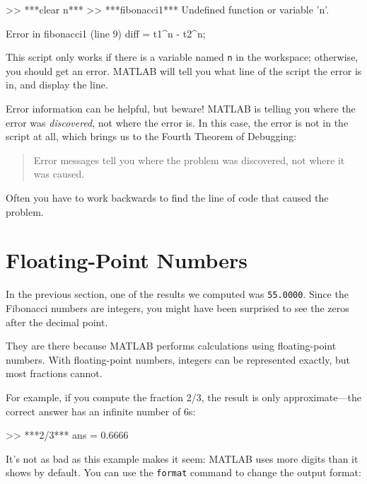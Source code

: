 \begin{code}
>> ***clear n***
>> ***fibonacci1***
Undefined function or variable 'n'.

Error in fibonacci1 (line 9)
diff = t1^n - t2^n;
\end{code}

This script only works if there is a variable named \lstinline{n} in the workspace; otherwise, you should get an error. 
MATLAB will tell you what line of the script the error is in, and display the line.



Error information can be helpful, but beware!  MATLAB is telling you
where the error was \emph{discovered}, not where the error is.  In this
case, the error is not in the script at all, which brings us to the Fourth Theorem of Debugging:

\begin{quote}
Error messages tell you where the problem was discovered,
not where it was caused.
\end{quote}

Often you have to work backwards to find the line of code that caused the problem.

\section{Floating-Point Numbers}

In the previous section, one of the results we computed was \lstinline{55.0000}.  Since the Fibonacci numbers are integers, you might have been surprised to see the zeros after the decimal point.

They are there because MATLAB performs calculations using floating-point numbers.  With floating-point numbers, integers can be represented exactly, but most fractions cannot.


For example, if you compute the fraction 2/3, the result is only approximate---the correct answer has an infinite number of 6s:

\begin{code}
>> ***2/3***
ans = 0.6666
\end{code}

 

It's not as bad as this example makes it seem: MATLAB uses more digits than it shows by default.
You can use the \lstinline{format} command to change the output format:

